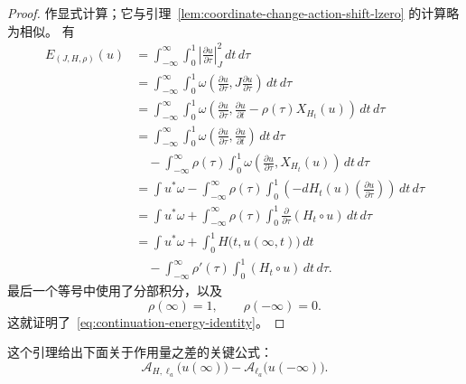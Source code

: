 \begin{proof}
作显式计算；它与引理~\ref{lem:coordinate-change-action-shift-lzero} 的计算略为相似。
有
\begin{align*}
  E_{(J,H,\rho)}(u)
  &=
  \int_{-\infty}^{\infty}\int_0^1
  \left|
    \frac{\partial u}{\partial\tau}
  \right|_J^2
  \,dt\,d\tau\\
  &=
  \int_{-\infty}^{\infty}\int_0^1
  \omega\left(
    \frac{\partial u}{\partial\tau},
    J\frac{\partial u}{\partial\tau}
  \right)\,dt\,d\tau\\
  &=
  \int_{-\infty}^{\infty}\int_0^1
  \omega\left(
    \frac{\partial u}{\partial\tau},
    \frac{\partial u}{\partial t}
    -
    \rho(\tau)X_{H_t}(u)
  \right)\,dt\,d\tau\\
  &=
  \int_{-\infty}^{\infty}\int_0^1
  \omega\left(
    \frac{\partial u}{\partial\tau},
    \frac{\partial u}{\partial t}
  \right)\,dt\,d\tau\\
  &\quad-
  \int_{-\infty}^{\infty}
  \rho(\tau)
  \int_0^1
  \omega\left(
    \frac{\partial u}{\partial\tau},
    X_{H_t}(u)
  \right)\,dt\,d\tau\\
  &=
  \int u^*\omega
  -
  \int_{-\infty}^{\infty}
  \rho(\tau)
  \int_0^1
  \left(
    -dH_t(u)
    \left(\frac{\partial u}{\partial\tau}\right)
  \right)\,dt\,d\tau\\
  &=
  \int u^*\omega
  +
  \int_{-\infty}^{\infty}
  \rho(\tau)
  \int_0^1
  \frac{\partial}{\partial\tau}(H_t\circ u)
  \,dt\,d\tau\\
  &=
  \int u^*\omega
  +
  \int_0^1H\bigl(t,u(\infty,t)\bigr)\,dt\\
  &\quad-
  \int_{-\infty}^{\infty}
  \rho'(\tau)
  \int_0^1(H_t\circ u)\,dt\,d\tau.
\end{align*}
最后一个等号中使用了分部积分，以及
\[
  \rho(\infty)=1,
  \qquad
  \rho(-\infty)=0.
\]
这就证明了~\eqref{eq:continuation-energy-identity}。
\end{proof}

这个引理给出下面关于作用量之差的关键公式：
\[
  \mathcal A_{H,\ell_a}\bigl(u(\infty)\bigr)
  -
  \mathcal A_{\ell_a}\bigl(u(-\infty)\bigr).
\]

